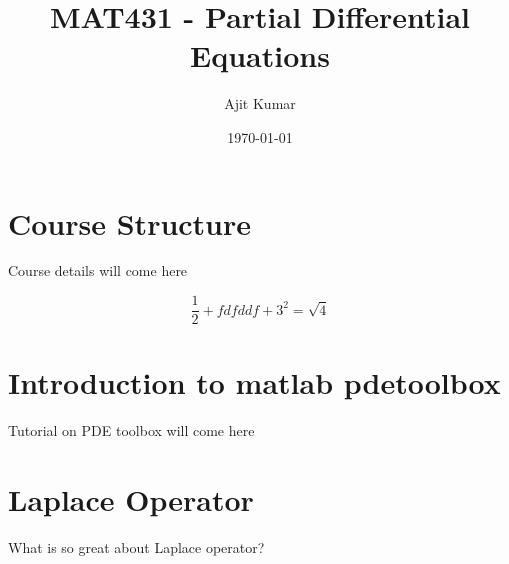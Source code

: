 \documentclass[11pt]{article}
\author{Ajit Kumar}
\date{\today}
\title{MAT431 - Partial Differential Equations}
\begin{document}
\maketitle
\tableofcontents


\section{Course Structure}
\label{sec-1}

Course details will come here

$$
\frac{1}{2} + fdfddf + 3^2 = \sqrt{4}
$$



\section{Introduction to matlab pdetoolbox}
\label{sec-2}

Tutorial on PDE toolbox will come here


\section{Laplace Operator}
\label{sec-3}

What is so great about Laplace operator?
\end{document}
